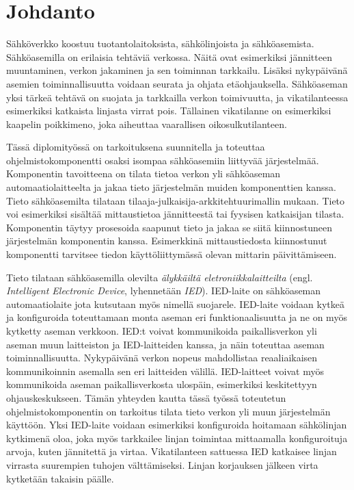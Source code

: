 \chapter{Johdanto}
\label{ch:johdanto}
Sähköverkko koostuu tuotantolaitoksista, sähkölinjoista ja sähköasemista. Sähköasemilla on erilaisia tehtäviä verkossa. Näitä ovat esimerkiksi jännitteen muuntaminen, verkon jakaminen ja sen toiminnan tarkkailu. Lisäksi nykypäivänä asemien toiminnallisuutta voidaan seurata ja ohjata etäohjauksella. Sähköaseman yksi tärkeä tehtävä on suojata ja tarkkailla verkon toimivuutta, ja vikatilanteessa esimerkiksi katkaista linjasta virrat pois. Tällainen vikatilanne on esimerkiksi kaapelin poikkimeno, joka aiheuttaa vaarallisen oikosulkutilanteen.

Tässä diplomityössä on tarkoituksena suunnitella ja toteuttaa ohjelmistokomponentti osaksi isompaa sähköasemiin liittyvää järjestelmää. Komponentin tavoitteena on tilata tietoa verkon yli sähköaseman automaatiolaitteelta ja jakaa tieto järjestelmän muiden komponenttien kanssa. Tieto sähköasemilta tilataan tilaaja-julkaisija-arkkitehtuurimallin mukaan. Tieto voi esimerkiksi sisältää mittaustietoa jännitteestä tai fyysisen katkaisijan tilasta. Komponentin täytyy prosesoida saapunut tieto ja jakaa se siitä kiinnostuneen järjestelmän komponentin kanssa. Esimerkkinä mittaustiedosta kiinnostunut komponentti tarvitsee tiedon käyttöliittymässä olevan mittarin päivittämiseen.

Tieto tilataan sähköasemilla olevilta \emph{älykkäiltä eletroniikkalaitteilta} (engl. \emph{Intelligent Electronic Device}, lyhennetään \emph{IED}). IED-laite on sähköaseman automaatiolaite jota kutsutaan myös nimellä suojarele. IED-laite voidaan kytkeä ja konfiguroida toteuttamaan monta aseman eri funktionaalisuutta ja ne on myös kytketty aseman verkkoon. IED:t voivat kommunikoida paikallisverkon yli aseman muun laitteiston ja IED-laitteiden kanssa, ja näin toteuttaa aseman toiminnallisuutta. Nykypäivänä verkon nopeus mahdollistaa reaaliaikaisen kommunikoinnin asemalla sen eri laitteiden välillä. IED-laitteet voivat myös kommunikoida aseman paikallisverkosta ulospäin, esimerkiksi keskitettyyn ohjauskeskukseen. Tämän yhteyden kautta tässä työssä toteutetun ohjelmistokomponentin on tarkoitus tilata tieto verkon yli muun järjestelmän käyttöön. Yksi IED-laite voidaan esimerkiksi konfiguroida hoitamaan sähkölinjan kytkimenä oloa, joka myös tarkkailee linjan toimintaa mittaamalla konfiguroituja arvoja, kuten jännitettä ja virtaa. Vikatilanteen sattuessa IED katkaisee linjan virrasta suurempien tuhojen välttämiseksi. Linjan korjauksen jälkeen virta kytketään takaisin päälle. \cite{Brunner2008}

